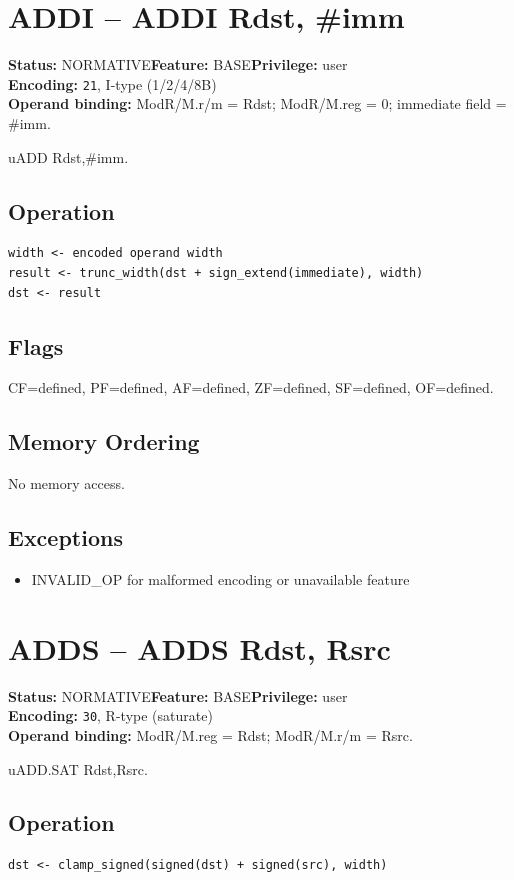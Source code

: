 \documentclass[10pt]{article}
\begin{document}
\section{ADDI -- ADDI Rdst, \#imm}
\textbf{Status:} NORMATIVE\quad \textbf{Feature:} BASE\quad \textbf{Privilege:} user\\
\textbf{Encoding:} \texttt{21}, I-type (1/2/4/8B)\\
\textbf{Operand binding:} ModR/M.r/m = Rdst; ModR/M.reg = 0; immediate field = \#imm.

uADD Rdst,\#imm.

\subsection*{Operation}
\begin{lstlisting}
width <- encoded operand width
result <- trunc_width(dst + sign_extend(immediate), width)
dst <- result
\end{lstlisting}
\subsection*{Flags}
CF=defined, PF=defined, AF=defined, ZF=defined, SF=defined, OF=defined.
\subsection*{Memory Ordering}
No memory access.
\subsection*{Exceptions}
\begin{itemize}
\item INVALID\_OP for malformed encoding or unavailable feature
\end{itemize}
\clearpage

\section{ADDS -- ADDS Rdst, Rsrc}
\textbf{Status:} NORMATIVE\quad \textbf{Feature:} BASE\quad \textbf{Privilege:} user\\
\textbf{Encoding:} \texttt{30}, R-type (saturate)\\
\textbf{Operand binding:} ModR/M.reg = Rdst; ModR/M.r/m = Rsrc.

uADD.SAT Rdst,Rsrc.

\subsection*{Operation}
\begin{lstlisting}
dst <- clamp_signed(signed(dst) + signed(src), width)
\end{lstlisting}
\end{document}
